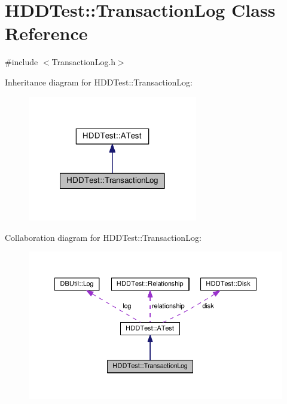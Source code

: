 \hypertarget{class_h_d_d_test_1_1_transaction_log}{\section{H\-D\-D\-Test\-:\-:Transaction\-Log Class Reference}
\label{class_h_d_d_test_1_1_transaction_log}
}


{\ttfamily \#include $<$Transaction\-Log.\-h$>$}



Inheritance diagram for H\-D\-D\-Test\-:\-:Transaction\-Log\-:
\nopagebreak
\begin{figure}[H]
\begin{center}
\leavevmode
\includegraphics[width=210pt]{class_h_d_d_test_1_1_transaction_log__inherit__graph}
\end{center}
\end{figure}


Collaboration diagram for H\-D\-D\-Test\-:\-:Transaction\-Log\-:
\nopagebreak
\begin{figure}[H]
\begin{center}
\leavevmode
\includegraphics[width=350pt]{class_h_d_d_test_1_1_transaction_log__coll__graph}
\end{center}
\end{figure}
